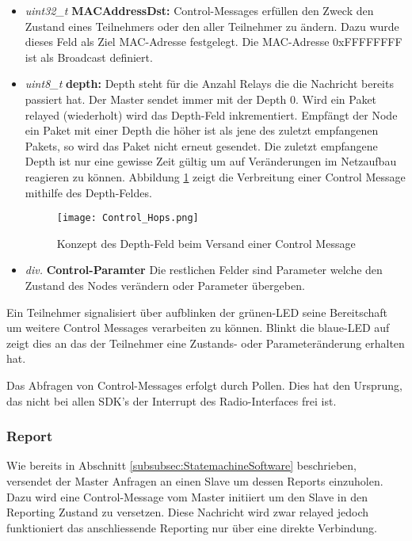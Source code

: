 \begin{itemize}
	\item \textit{uint32\_t} \textbf{MACAddressDst:} Control-Messages erfüllen den Zweck den Zustand eines Teilnehmers oder den aller Teilnehmer zu ändern.
Dazu wurde dieses Feld als Ziel MAC-Adresse festgelegt. Die MAC-Adresse 0xFFFFFFFF ist als Broadcast definiert.
	
	\item \textit{uint8\_t} \textbf{depth:} Depth steht für die Anzahl Relays die die Nachricht bereits passiert hat.
	Der Master sendet immer mit der Depth 0.
	Wird ein Paket relayed (wiederholt) wird das Depth-Feld inkrementiert.
	Empfängt der Node ein Paket mit einer Depth die höher ist als jene des zuletzt empfangenen Pakets, so wird das Paket nicht erneut gesendet.
	Die zuletzt empfangene Depth ist nur eine gewisse Zeit gültig um auf Veränderungen im Netzaufbau reagieren zu können.
	Abbildung \ref{fig:ControlMessagesHops} zeigt die Verbreitung einer Control Message mithilfe des Depth-Feldes.
	
	
\begin{figure}[H]
\centering
\texttt{[image: Control\_Hops.png]}
\caption{Konzept des Depth-Feld beim Versand einer Control Message}\label{fig:ControlMessagesHops}
\end{figure}

	
	\item \textit{div.} \textbf{Control-Paramter} Die restlichen Felder sind Parameter welche den Zustand des Nodes verändern oder Parameter übergeben. 
\end{itemize}


Ein Teilnehmer signalisiert über aufblinken der grünen-LED seine Bereitschaft um weitere Control Messages verarbeiten zu können. Blinkt die blaue-LED auf zeigt dies an das der Teilnehmer eine Zustands- oder Parameteränderung erhalten hat. 

Das Abfragen von Control-Messages erfolgt durch Pollen.
Dies hat den Ursprung, das nicht bei allen SDK's der Interrupt des Radio-Interfaces frei ist.


\subsubsection{Report}\label{subsubsec:Report}

Wie bereits in Abschnitt \ref{subsubsec:StatemachineSoftware} beschrieben, versendet der Master Anfragen an einen Slave um dessen Reports einzuholen.
Dazu wird eine Control-Message vom Master initiiert um den Slave in den Reporting Zustand zu versetzen.
Diese Nachricht wird zwar relayed jedoch funktioniert das anschliessende Reporting nur über eine direkte Verbindung.

